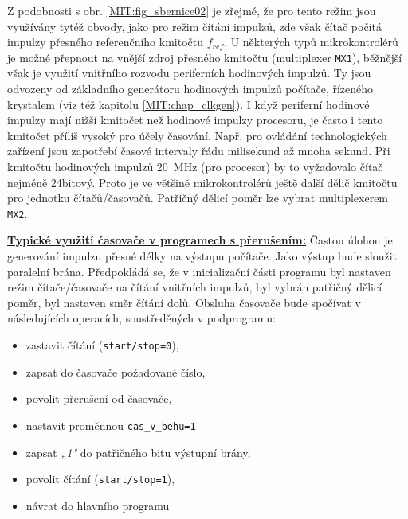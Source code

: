         Z podobnosti s obr. \ref{MIT:fig_sbernice02} je zřejmé, že pro tento režim jsou využívány 
        tytéž obvody, jako pro režim čítání impulzů, zde však čítač počítá impulzy přesného 
        referenčního kmitočtu \(f_{ref}\). U některých typů mikrokontrolérů je možné přepnout na 
        vnější zdroj přesného kmitočtu (multiplexer \texttt{MX1}), běžnější však je využití 
        vnitřního rozvodu periferních hodinových impulzů. Ty jsou odvozeny od základního generátoru 
        hodinových impulzů počítače, řízeného krystalem (viz též kapitolu \ref{MIT:chap_clkgen}). I 
        když periferní hodinové impulzy mají nižší kmitočet než hodinové impulzy procesoru, je 
        často i tento kmitočet příliš vysoký pro účely časování. Např. pro ovládání technologických 
        zařízení jsou zapotřebí časové intervaly řádu milisekund až mnoha sekund. Při kmitočtu 
        hodinových impulzů \SI{20}{\mega\hertz} (pro procesor) by to vyžadovalo čítač nejméně 
        24bitový. Proto je ve většině mikrokontrolérů ještě další dělič kmitočtu pro jednotku 
        čítačů/časovačů. Patřičný dělicí poměr lze vybrat multiplexerem \texttt{MX2}.
        
        \underline{\textbf{Typické využití časovače v programech s přerušením:}}
        Častou úlohou je generování impulzu přesné délky na výstupu počítače. Jako výstup bude 
        sloužit paralelní brána. Předpokládá se, že v inicializační části programu byl nastaven 
        režim čítače/časovače na čítání vnitřních impulzů, byl vybrán patřičný dělicí poměr, byl 
        nastaven směr čítání dolů. Obsluha časovače bude spočívat v následujících operacích, 
        soustředěných v podprogramu:
        \begin{itemize}\addtolength{\itemsep}{-0.5\baselineskip}
          \item zastavit čítání (\texttt{start/stop=0}),
          \item zapsat do časovače požadované číslo,
          \item povolit přerušení od časovače,
          \item nastavit proměnnou \texttt{cas\_v\_behu=1}
          \item zapsat \emph{„1"} do patřičného bitu výstupní brány,
          \item povolit čítání (\texttt{start/stop=1}),
          \item návrat do hlavního programu 
        \end{itemize}
        
